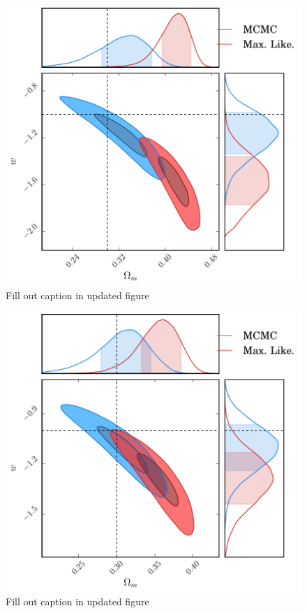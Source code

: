 \documentclass[a4paper,fleqn,usenatbib]{mnras}
\newcommand{\red}{\color{red}}
\begin{document}
\begin{figure}
	\includegraphics[width=\columnwidth]{../output/comparison_shallow.pdf}
	\caption{{\red Fill out caption in updated figure}}
	\label{fig:comparison_shallow}
\end{figure}
\begin{figure}
	\includegraphics[width=\columnwidth]{../output/comparison_deep.pdf}
	\caption{{\red Fill out caption in updated figure}}
	\label{fig:comparison_deep}
\end{figure}
\end{document}
